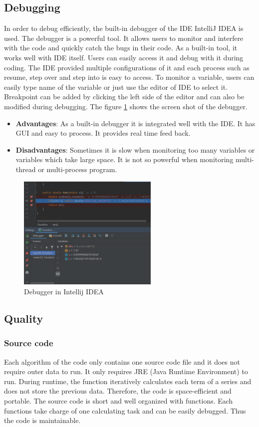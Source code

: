 \documentclass{article}
\begin{document}
\subsection{Debugging}
In order to debug efficiently, the built-in debugger of the IDE IntelliJ IDEA is used. The debugger is a powerful tool. It allows users to monitor and interfere with the code and quickly catch the bugs in their code. As a built-in tool, it works well with IDE itself. Users can easily access it and debug with it during coding. The IDE provided multiple configurations of it and each process such as resume, step over and step into is easy to access. To monitor a variable, users can easily type name of the variable or just use the editor of IDE to select it. Breakpoint can be added by clicking the left side of the editor and can also be modified during debugging. The figure \ref{Fig.debug} shows the screen shot of the debugger.
\begin{itemize}
    \item \textbf{Advantages}: As a built-in debugger it is integrated well with the IDE. It has GUI and easy to process. It provides real time feed back.
    \item \textbf{Disadvantages}: Sometimes it is slow when monitoring too many variables or variables which take large space. It is not so powerful when monitoring multi-thread or multi-process program.
\end{itemize}
\begin{figure}[H]
\centering
\includegraphics[width=0.6\textwidth]{debugger.png}
\caption{Debugger in Intellij IDEA}
\label{Fig.debug}
\end{figure}

\newpage
\subsection{Quality}
\subsubsection{Source code}
Each algorithm of the code only contains one source code file and it does not require outer data to run. It only requires JRE (Java Runtime Environment) to run. During runtime, the function iteratively calculates each term of a series and does not store the previous data. Therefore, the code is space-efficient and portable. The source code is short and well organized with functions. Each functions take charge of one calculating task and can be easily debugged. Thus the code is maintainable.
\end{document}
